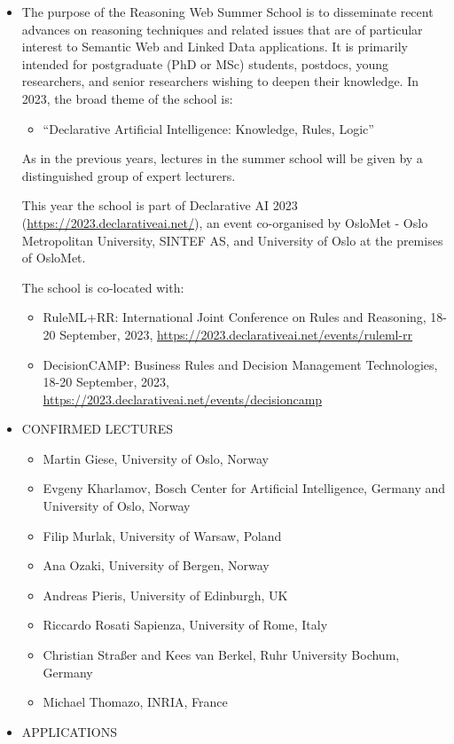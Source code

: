 \documentclass[prodmode,acmtecs]{acmsmall} %
\begin{document}
\begin{itemize}\item  The purpose of the Reasoning Web Summer School is to disseminate recent advances on reasoning techniques and related issues that are of particular interest to Semantic Web and Linked Data applications. It is primarily intended for postgraduate (PhD or MSc) students, postdocs, young researchers, and senior researchers wishing to deepen their knowledge. In 2023, the broad theme of the school is: 
 
\begin{itemize}\item  “Declarative Artificial Intelligence: Knowledge, Rules, Logic”
\end{itemize} 
   As in the previous years, lectures in the summer school will be given by a distinguished group of expert lecturers. 
 
  This year the school is part of Declarative AI 2023 (\href{https://2023.declarativeai.net/}{https://2023.declarativeai.net/}), an event co-organised by OsloMet - Oslo Metropolitan University, SINTEF AS, and University of Oslo at the premises of OsloMet. 
 
  The school is co-located with: 
 
\begin{itemize}\item  RuleML+RR: International Joint Conference on Rules and Reasoning, 18-20 September, 2023, \href{https://2023.declarativeai.net/events/ruleml-rr}{https://2023.declarativeai.net/events/ruleml-rr} 
\item  DecisionCAMP: Business Rules and Decision Management Technologies, 18-20 September, 2023, \href{https://2023.declarativeai.net/events/decisioncamp}{https://2023.declarativeai.net/events/decisioncamp}
\end{itemize} 
\item  CONFIRMED LECTURES  
 
\begin{itemize}\item  Martin Giese, University of Oslo, Norway
\item  Evgeny Kharlamov, Bosch Center for Artificial Intelligence, Germany and University of Oslo, Norway
\item  Filip Murlak, University of Warsaw, Poland
\item  Ana Ozaki, University of Bergen, Norway
\item  Andreas Pieris, University of Edinburgh, UK
\item  Riccardo Rosati Sapienza, University of Rome, Italy
\item  Christian Straßer and Kees van Berkel, Ruhr University Bochum, Germany
\item  Michael Thomazo, INRIA, France
\end{itemize} 
\item  APPLICATIONS  
 

\end{itemize}
\end{document}
